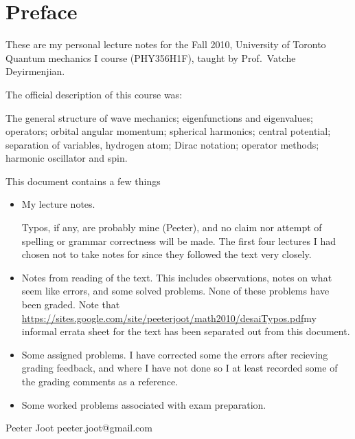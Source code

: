 %
%

% 
% 
\chapter*{Preface}%

These are my personal lecture notes for the Fall 2010, University of Toronto Quantum mechanics I course (PHY356H1F), taught by Prof.\ Vatche Deyirmenjian.

The official description of this course was:

The general structure of wave mechanics; eigenfunctions and eigenvalues; operators; orbital angular momentum; spherical harmonics; central potential; separation of variables, hydrogen atom; Dirac notation; operator methods; harmonic oscillator and spin.

This document contains a few things

\begin{itemize}
\item My lecture notes.

Typos, if any, are probably mine (Peeter), and no claim nor attempt of spelling or grammar correctness will be made.  The first four lectures I had chosen not to take notes for since they followed the text \citep{desai2009quantum} very closely.

\item Notes from reading of the text.  This includes observations, notes on what seem like errors, and some solved problems.  None of these problems have been graded.  Note that \url{https://sites.google.com/site/peeterjoot/math2010/desaiTypos.pdf}{my informal errata sheet} for the text has been separated out from this document.

\item Some assigned problems.  I have corrected some the errors after recieving grading feedback, and where I have not done so I at least recorded some of the grading comments as a reference.

\item Some worked problems associated with exam preparation.

\end{itemize}

Peeter Joot  \quad peeter.joot@gmail.com 
